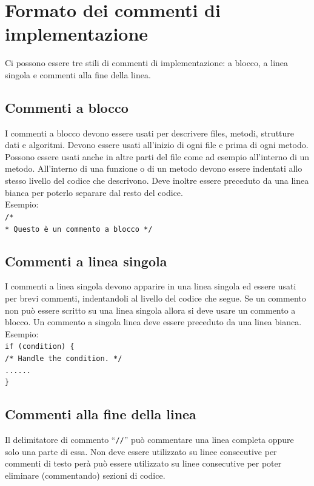 \documentclass[11pt,titlepage,a4paper]{report}
\begin{document}
\section{Formato dei commenti di implementazione}
Ci possono essere tre stili di commenti di implementazione: a blocco, a linea singola e commenti alla fine della linea.
\subsection{Commenti a blocco}
I commenti a blocco devono essere usati per descrivere files, metodi, strutture dati e algoritmi. Devono essere usati all'inizio di ogni file e prima
di ogni metodo. Possono essere usati anche in altre parti del file come ad esempio all'interno di un metodo. All'interno di una funzione o di un metodo devono essere indentati allo stesso livello del codice che descrivono. Deve inoltre essere preceduto da una linea bianca per poterlo separare dal resto del codice. \\
 \newline
Esempio: \\
\texttt{/* \\
* Questo è un commento a blocco \newline
 */ } \\
 \newline
\subsection{Commenti a linea singola}
I commenti a linea singola devono apparire in una linea singola ed essere usati per brevi commenti, indentandoli al livello del codice che segue. Se un commento non può essere scritto su una linea singola allora si deve usare un commento a blocco. Un commento a singola linea deve essere preceduto da una linea bianca. \\
 \newline
Esempio: \\
\texttt{if (condition) \{ \\
        /* Handle the condition. */ \\
        ...... \\
\}} \\
 \newline
\subsection{Commenti alla fine della linea}
Il delimitatore di commento ``\texttt{//}'' può commentare una linea completa oppure solo una parte di essa. Non deve essere utilizzato su linee consecutive per commenti di testo per\`a può essere utilizzato su linee consecutive per poter eliminare (commentando) sezioni di codice.
\end{document}
